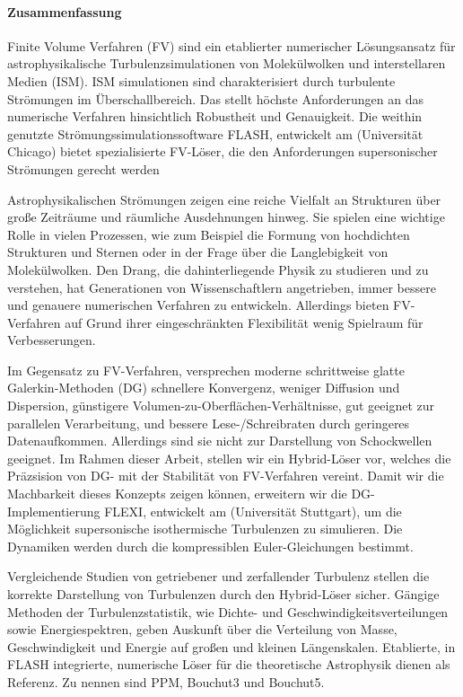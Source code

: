 \newpage
\paragraph{Zusammenfassung}
Finite Volume Verfahren (FV) sind ein etablierter numerischer Lösungsansatz für
astrophysikalische Turbulenzsimulationen von Molekülwolken und interstellaren
Medien (ISM). ISM simulationen sind charakterisiert durch turbulente Strömungen
im Überschallbereich. Das stellt höchste Anforderungen an das numerische
Verfahren hinsichtlich Robustheit und Genauigkeit. Die weithin genutzte
Strömungssimulationssoftware FLASH, entwickelt am  (Universität Chicago) bietet spezialisierte FV-Löser,
die den Anforderungen supersonischer Strömungen gerecht werden

Astrophysikalischen Strömungen zeigen eine reiche Vielfalt an Strukturen über
große Zeiträume und räumliche Ausdehnungen hinweg. Sie spielen eine wichtige
Rolle in vielen Prozessen, wie zum Beispiel die Formung von hochdichten
Strukturen und Sternen oder in der Frage über die Langlebigkeit von
Molekülwolken. Den Drang, die dahinterliegende Physik zu studieren und zu
verstehen, hat Generationen von Wissenschaftlern angetrieben, immer bessere und
genauere numerischen Verfahren zu entwickeln. Allerdings bieten FV-Verfahren
auf Grund ihrer eingeschränkten Flexibilität wenig Spielraum für Verbesserungen.

Im Gegensatz zu FV-Verfahren, versprechen moderne schrittweise glatte
Galerkin-Methoden (DG) schnellere Konvergenz, weniger Diffusion und Dispersion,
günstigere Volumen-zu-Oberflächen-Verhältnisse, gut geeignet zur parallelen
Verarbeitung, und bessere Lese-/Schreibraten durch geringeres Datenaufkommen.
Allerdings sind sie nicht zur Darstellung von Schockwellen geeignet. Im Rahmen
dieser Arbeit, stellen wir ein Hybrid-Löser vor, welches die Präzsision von
DG- mit der Stabilität von FV-Verfahren vereint. Damit wir die Machbarkeit
dieses Konzepts zeigen können, erweitern wir die DG-Implementierung FLEXI,
entwickelt am  (Universität Stuttgart),
um die Möglichkeit supersonische isothermische Turbulenzen zu simulieren.
Die Dynamiken werden durch die kompressiblen Euler-Gleichungen bestimmt.

Vergleichende Studien von getriebener und zerfallender Turbulenz stellen die
korrekte Darstellung von Turbulenzen durch den Hybrid-Löser sicher.  Gängige
Methoden der Turbulenzstatistik, wie Dichte- und Geschwindigkeitsverteilungen
sowie Energiespektren, geben Auskunft über die Verteilung von Masse,
Geschwindigkeit und Energie auf großen und kleinen Längenskalen. Etablierte, in
FLASH integrierte, numerische Löser für die theoretische Astrophysik dienen als
Referenz. Zu nennen sind PPM, Bouchut3 und Bouchut5.
